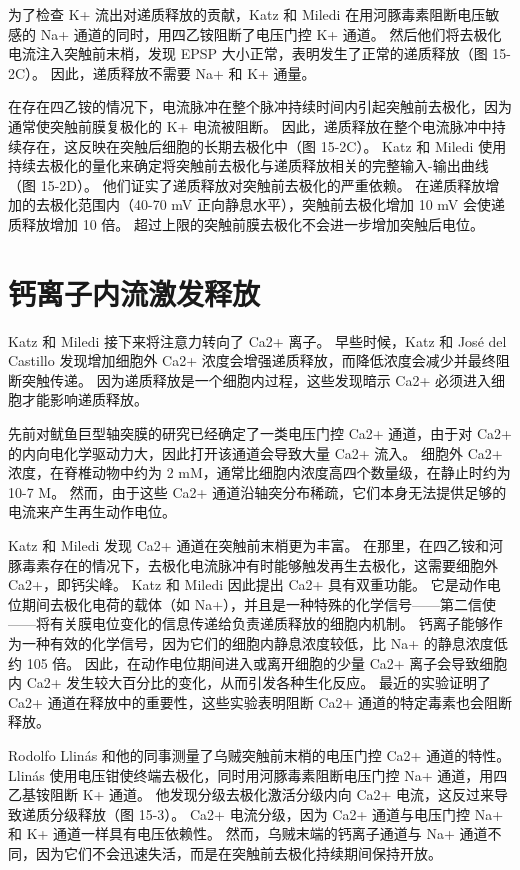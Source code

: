 为了检查 K+ 流出对递质释放的贡献，Katz 和 Miledi 在用河豚毒素阻断电压敏感的 Na+ 通道的同时，用四乙铵阻断了电压门控 K+ 通道。 
然后他们将去极化电流注入突触前末梢，发现 EPSP 大小正常，表明发生了正常的递质释放（图 15-2C）。 
因此，递质释放不需要 Na+ 和 K+ 通量。


在存在四乙铵的情况下，电流脉冲在整个脉冲持续时间内引起突触前去极化，因为通常使突触前膜复极化的 K+ 电流被阻断。 
因此，递质释放在整个电流脉冲中持续存在，这反映在突触后细胞的长期去极化中（图 15-2C）。 
Katz 和 Miledi 使用持续去极化的量化来确定将突触前去极化与递质释放相关的完整输入-输出曲线（图 15-2D）。 
他们证实了递质释放对突触前去极化的严重依赖。 在递质释放增加的去极化范围内（40-70 mV 正向静息水平），突触前去极化增加 10 mV 会使递质释放增加 10 倍。 
超过上限的突触前膜去极化不会进一步增加突触后电位。


\section{钙离子内流激发释放}
Katz 和 Miledi 接下来将注意力转向了 Ca2+ 离子。 早些时候，Katz 和 José del Castillo 发现增加细胞外 Ca2+ 浓度会增强递质释放，而降低浓度会减少并最终阻断突触传递。 因为递质释放是一个细胞内过程，这些发现暗示 Ca2+ 必须进入细胞才能影响递质释放。

先前对鱿鱼巨型轴突膜的研究已经确定了一类电压门控 Ca2+ 通道，由于对 Ca2+ 的内向电化学驱动力大，因此打开该通道会导致大量 Ca2+ 流入。 细胞外 Ca2+ 浓度，在脊椎动物中约为 2 mM，通常比细胞内浓度高四个数量级，在静止时约为 10-7 M。 然而，由于这些 Ca2+ 通道沿轴突分布稀疏，它们本身无法提供足够的电流来产生再生动作电位。

Katz 和 Miledi 发现 Ca2+ 通道在突触前末梢更为丰富。 在那里，在四乙铵和河豚毒素存在的情况下，去极化电流脉冲有时能够触发再生去极化，这需要细胞外 Ca2+，即钙尖峰。 Katz 和 Miledi 因此提出 Ca2+ 具有双重功能。 它是动作电位期间去极化电荷的载体（如 Na+），并且是一种特殊的化学信号——第二信使——将有关膜电位变化的信息传递给负责递质释放的细胞内机制。 钙离子能够作为一种有效的化学信号，因为它们的细胞内静息浓度较低，比 Na+ 的静息浓度低约 105 倍。 因此，在动作电位期间进入或离开细胞的少量 Ca2+ 离子会导致细胞内 Ca2+ 发生较大百分比的变化，从而引发各种生化反应。 最近的实验证明了 Ca2+ 通道在释放中的重要性，这些实验表明阻断 Ca2+ 通道的特定毒素也会阻断释放。

Rodolfo Llinás 和他的同事测量了乌贼突触前末梢的电压门控 Ca2+ 通道的特性。 Llinás 使用电压钳使终端去极化，同时用河豚毒素阻断电压门控 Na+ 通道，用四乙基铵阻断 K+ 通道。 他发现分级去极化激活分级内向 Ca2+ 电流，这反过来导致递质分级释放（图 15-3）。 Ca2+ 电流分级，因为 Ca2+ 通道与电压门控 Na+ 和 K+ 通道一样具有电压依赖性。 然而，乌贼末端的钙离子通道与 Na+ 通道不同，因为它们不会迅速失活，而是在突触前去极化持续期间保持开放。


